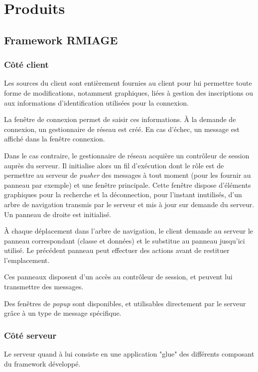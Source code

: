 \section{Produits}
\subsection{Framework RMIAGE}

\subsubsection{Côté client} %
\label{ssub:côté_client}

Les sources du client sont entièrement fournies au client pour lui permettre toute forme de modifications, notamment graphiques, liées à gestion des inscriptions ou aux informations d'identification utilisées pour la connexion.

La fenêtre de connexion permet de saisir ces informations. À la demande de connexion, un gestionnaire de réseau est créé. En cas d'échec, un message est affiché dans la fenêtre connexion.

Dans le cas contraire, le gestionnaire de réseau acquière un contrôleur de session auprès du serveur. Il initialise alors un fil d'exécution dont le rôle est de permettre au serveur de \emph{pusher} des messages à tout moment (pour les fournir au panneau par exemple) et une fenêtre principale. Cette fenêtre dispose d'éléments graphiques pour la recherche et la déconnection, pour l'instant inutilisés, d'un arbre de navigation transmis par le serveur et mis à jour sur demande du serveur. Un panneau de droite est initialisé.

À chaque déplacement dans l'arbre de navigation, le client demande au serveur le panneau correspondant (classe et données) et le substitue au panneau jusqu'ici utilisé. Le précédent panneau peut effectuer des actions avant de restituer l'emplacement.

Ces panneaux disposent d'un accès au contrôleur de session, et peuvent lui transmettre des messages.

Des fenêtres de \emph{popup} sont disponibles, et utilisables directement par le serveur grâce à un type de message spécifique.

\subsubsection{Côté serveur} %
\label{ssub:côté_serveur}
Le serveur quand à lui consiste en une application "glue" des différents composant du framework développé.

